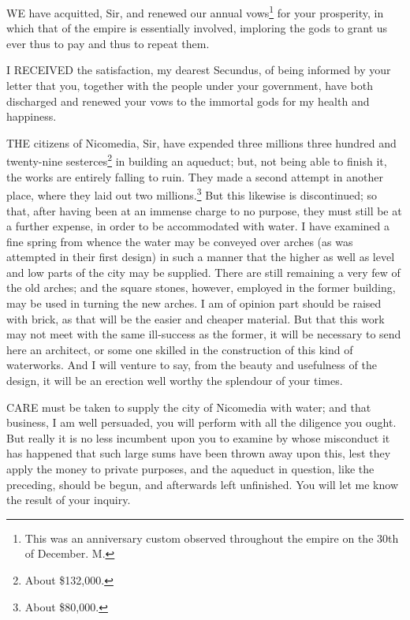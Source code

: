 
WE have acquitted, Sir, and renewed our annual vows\footnote{This was an
anniversary custom observed throughout the empire on the 30th of December.
M.} for your
prosperity, in which that of the empire is essentially involved, imploring
the gods to grant us ever thus to pay and thus to repeat them.


I RECEIVED the satisfaction, my dearest Secundus, of being informed by
your letter that you, together with the people under your government, have
both discharged and renewed your vows to the immortal gods for my health
and happiness.


THE citizens of Nicomedia, Sir, have expended three millions three hundred
and twenty-nine sesterces\footnote{About \$132,000.} in building an aqueduct; but, not being
able to finish it, the works are entirely falling to ruin. They made a
second attempt in another place, where they laid out two millions.\footnote{About \$80,000.}
But this likewise is discontinued; so that, after having been at an
immense charge to no purpose, they must still be at a further expense, in
order to be accommodated with water. I have examined a fine spring from
whence the water may be conveyed over arches (as was attempted in their
first design) in such a manner that the higher as well as level and low
parts of the city may be supplied. There are still remaining a very few of
the old arches; and the square stones, however, employed in the former
building, may be used in turning the new arches. I am of opinion part
should be raised with brick, as that will be the easier and cheaper
material. But that this work may not meet with the same ill-success as the
former, it will be necessary to send here an architect, or some one
skilled in the construction of this kind of waterworks. And I will venture
to say, from the beauty and usefulness of the design, it will be an
erection well worthy the splendour of your times.


CARE must be taken to supply the city of Nicomedia with water; and that
business, I am well persuaded, you will perform with all the diligence you
ought. But really it is no less incumbent upon you to examine by whose
misconduct it has happened that such large sums have been thrown away upon
this, lest they apply the money to private purposes, and the aqueduct in
question, like the preceding, should be begun, and afterwards left
unfinished. You will let me know the result of your inquiry.

